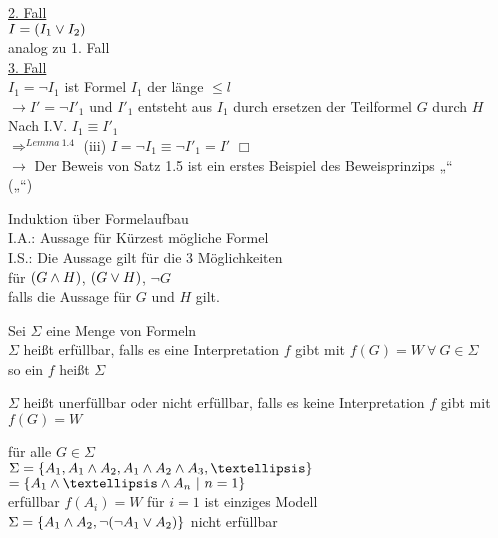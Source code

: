 \noindent
\underline{2. Fall}\\
$I = (I_1 \vee I_2)$\\
analog zu 1. Fall\\

\noindent
\underline{3. Fall}\\
$I_1 = \neg I_1$ ist Formel $I_1$ der länge $\leq l$\\
$\rightarrow I' = \neg I'_1$ und $I'_1$ entsteht aus $I_1$ durch ersetzen der Teilformel $G$ durch $H$\\

\noindent
Nach I.V. \hspace{1cm} $I_1 \equiv I'_1$\\
$\Rightarrow^{Lemma\ 1.4}$ (iii) $I = \neg I_1 \equiv \neg I'_1 = I'$ $\Box$\\
$\rightarrow$ Der Beweis von Satz 1.5 ist ein erstes Beispiel des Beweisprinzips „“\\
(„“)


\beweis{}
Induktion über Formelaufbau\\
I.A.: Aussage für Kürzest mögliche Formel\\
I.S.: Die Aussage gilt für die 3 Möglichkeiten\\
für $(G \wedge H)$, $(G \vee H)$, $\neg G$\\
falls die Aussage für $G$ und $H$ gilt.

Sei $\Sigma$ eine Menge von Formeln\\
$\Sigma$ heißt erfüllbar, falls es eine Interpretation $f$ gibt mit $f(G) = W\ \forall\ G \in \Sigma$\\
so ein $f$ heißt  $\Sigma$

\noindent
$\Sigma$ heißt unerfüllbar oder nicht erfüllbar, falls es keine Interpretation $f$ gibt mit $f(G) = W$

\noindent
für alle $G \in \Sigma$\\

\beispiel{}
$\Sigma = \{A_1, A_1 \AND A_2, A_1 \AND A_2 \AND A_3, … \}$\\
$= \{A_1 \AND … \AND A_n \ |\ n=1 \}$\\

\noindent
erfüllbar $f(A_i) = W$ für $i=1$ ist einziges Modell\\
$\Sigma = \{A_1 \wedge A_2, \neg ( \neg A_1 \vee A_2) \}$ nicht erfüllbar\\

